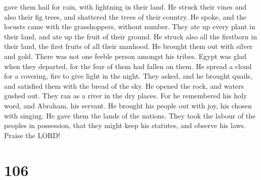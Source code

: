 gave them hail for rain, with lightning in their land.  He
struck their vines and also their fig trees, and shattered the trees of
their country.  He spoke, and the locusts came with the
grasshoppers, without number.  They ate up every plant in
their land, and ate up the fruit of their ground.  He
struck also all the firstborn in their land, the first fruits of all
their manhood.  He brought them out with silver and gold.
There was not one feeble person amongst his tribes.  Egypt
was glad when they departed, for the fear of them had fallen on them.
 He spread a cloud for a covering, fire to give light in
the night.  They asked, and he brought quails, and
satisfied them with the bread of the sky.  He opened the
rock, and waters gushed out. They ran as a river in the dry places.
 For he remembered his holy word, and Abraham, his servant.
 He brought his people out with joy, his chosen with
singing.  He gave them the lands of the nations. They took
the labour of the peoples in possession,  that they might
keep his statutes, and observe his laws. Praise the LORD!

\hypertarget{section-98}{%
\section{106}\label{section-98}}


